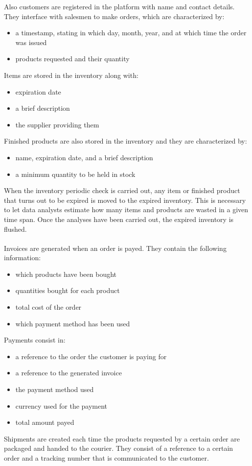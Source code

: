 \vspace{5pt}
Also customers are registered in the platform with name and contact details. They interface with salesmen to make orders, which are characterized by:
\begin{itemize}
	\item a timestamp, stating in which day, month, year, and at which time the order was issued
	\item products requested and their quantity
\end{itemize}
\vspace{5pt}
Items are stored in the inventory along with:
\begin{itemize}
	\item expiration date
	\item a brief description
	\item the supplier providing them
\end{itemize}
\vspace{5pt}
Finished products are also stored in the inventory and they are characterized by:
\begin{itemize}
	\item name, expiration date, and a brief description
	\item a minimum quantity to be held in stock
\end{itemize}
\vspace{5pt}
When the inventory periodic check is carried out, any item or finished product that turns out to be expired is moved to the expired inventory. This is necessary to let data analysts estimate how many items and products are wasted in a given time span. Once the analyses have been carried out, the expired inventory is flushed.\\\\
Invoices are generated when an order is payed. They contain the following information:
\begin{itemize}
	\item which products have been bought
	\item quantities bought for each product
	\item total cost of the order
	\item which payment method has been used
\end{itemize}
\vspace{5pt}
Payments consist in:
\begin{itemize}
	\item a reference to the order the customer is paying for
	\item a reference to the generated invoice
	\item the payment method used
	\item currency used for the payment
	\item total amount payed
\end{itemize}
\vspace{5pt}
Shipments are created each time the products requested by a certain order are packaged and handed to the courier. They consist of a reference to a certain order and a tracking number that is communicated to the customer.
